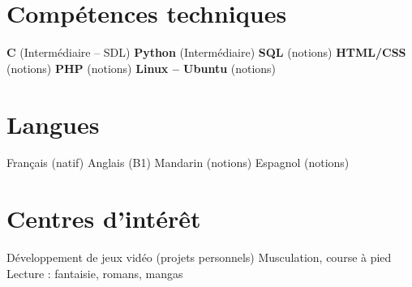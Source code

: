 \documentclass[a4paper,10pt]{article}
\begin{document}
\section{Compétences techniques}
\textbf{C} (Intermédiaire – SDL) \quad
\textbf{Python} (Intermédiaire) \quad
\textbf{SQL} (notions) \quad
\textbf{HTML/CSS} (notions) \quad
\textbf{PHP} (notions) \quad
\textbf{Linux – Ubuntu} (notions)

\section{Langues}
Français (natif) \quad
Anglais (B1) \quad
Mandarin (notions) \quad
Espagnol (notions)

\section{Centres d'intérêt}
Développement de jeux vidéo (projets personnels) \quad
Musculation, course à pied \quad
Lecture : fantaisie, romans, mangas
\end{document}
